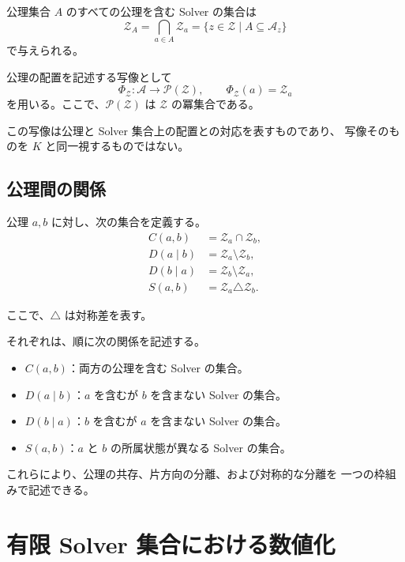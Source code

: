 \documentclass[a4paper,11pt]{ltjsarticle}
\begin{document}
公理集合 $A$ のすべての公理を含む Solver の集合は
\begin{equation}
  \mathcal{Z}_A
  =
  \bigcap_{a\in A}\mathcal{Z}_a
  =
  \{z\in\mathcal{Z}\mid A\subseteq\mathcal{A}_z\}
\end{equation}
で与えられる。

公理の配置を記述する写像として
\begin{equation}
  \Phi_{\mathcal{Z}}:
  \mathcal{A}\longrightarrow\mathcal{P}(\mathcal{Z}),
  \qquad
  \Phi_{\mathcal{Z}}(a)=\mathcal{Z}_a
\end{equation}
を用いる。ここで、$\mathcal{P}(\mathcal{Z})$ は
$\mathcal{Z}$ の冪集合である。

この写像は公理と Solver 集合上の配置との対応を表すものであり、
写像そのものを $K$ と同一視するものではない。

\subsection{公理間の関係}

公理 $a,b$ に対し、次の集合を定義する。
\begin{align}
  C(a,b)
  &=\mathcal{Z}_a\cap\mathcal{Z}_b,\\
  D(a\mid b)
  &=\mathcal{Z}_a\setminus\mathcal{Z}_b,\\
  D(b\mid a)
  &=\mathcal{Z}_b\setminus\mathcal{Z}_a,\\
  S(a,b)
  &=\mathcal{Z}_a\triangle\mathcal{Z}_b.
\end{align}

ここで、$\triangle$ は対称差を表す。

それぞれは、順に次の関係を記述する。

\begin{itemize}
  \item $C(a,b)$：両方の公理を含む Solver の集合。
  \item $D(a\mid b)$：$a$ を含むが $b$ を含まない Solver の集合。
  \item $D(b\mid a)$：$b$ を含むが $a$ を含まない Solver の集合。
  \item $S(a,b)$：$a$ と $b$ の所属状態が異なる Solver の集合。
\end{itemize}

これらにより、公理の共存、片方向の分離、および対称的な分離を
一つの枠組みで記述できる。

\section{有限 Solver 集合における数値化}
\end{document}
